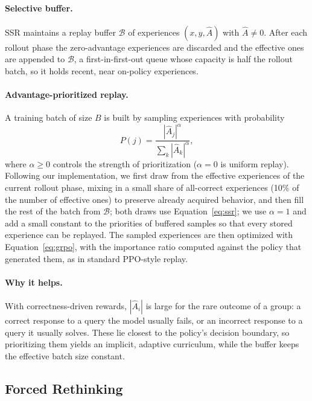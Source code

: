 \documentclass{article}
\begin{document}
\paragraph{Selective buffer.} SSR maintains a replay buffer $\mathcal{B}$ of experiences $(x,y,\hat{A})$ with $\hat{A}\neq0$. After each rollout phase the zero-advantage experiences are discarded and the effective ones are appended to $\mathcal{B}$, a first-in-first-out queue whose capacity is half the rollout batch, so it holds recent, near on-policy experiences.

\paragraph{Advantage-prioritized replay.} A training batch of size $B$ is built by sampling experiences with probability
\begin{equation}
P(j)=\frac{|\hat{A}_j|^{\alpha}}{\sum_{k}|\hat{A}_k|^{\alpha}},
\label{eq:ssr}
\end{equation}
where $\alpha\geq0$ controls the strength of prioritization ($\alpha=0$ is uniform replay). Following our implementation, we first draw from the effective experiences of the current rollout phase, mixing in a small share of all-correct experiences (10\% of the number of effective ones) to preserve already acquired behavior, and then fill the rest of the batch from $\mathcal{B}$; both draws use Equation~\eqref{eq:ssr}; we use $\alpha=1$ and add a small constant to the priorities of buffered samples so that every stored experience can be replayed. The sampled experiences are then optimized with Equation~\eqref{eq:grpo}, with the importance ratio computed against the policy that generated them, as in standard PPO-style replay.

\paragraph{Why it helps.} With correctness-driven rewards, $|\hat{A}_i|$ is large for the rare outcome of a group: a correct response to a query the model usually fails, or an incorrect response to a query it usually solves. These lie closest to the policy's decision boundary, so prioritizing them yields an implicit, adaptive curriculum, while the buffer keeps the effective batch size constant.

\subsection{Forced Rethinking}
\label{sec:rethink}
\end{document}
